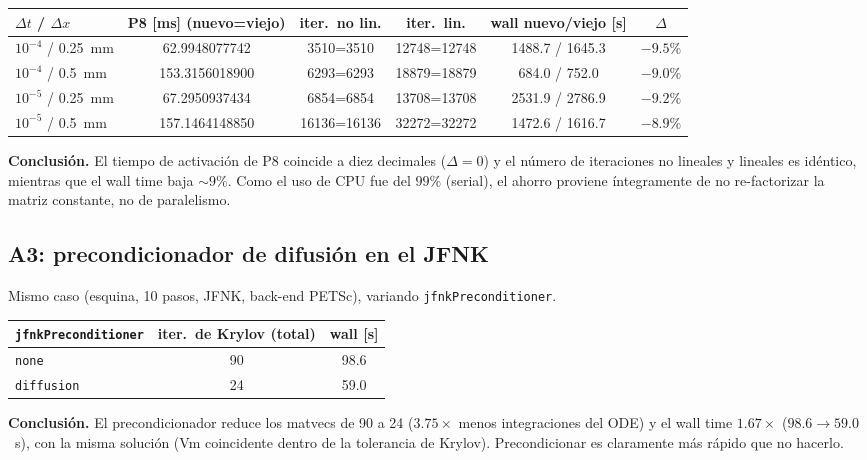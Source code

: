 \documentclass[11pt,a4paper]{article}
\newcommand{\code}[1]{\texttt{\small #1}}
\newcommand{\dictkey}[1]{\textcolor{black!60!green}{\texttt{\footnotesize #1}}}
\begin{document}
\begin{center}
\begin{tabular}{@{}lccccc@{}}
\toprule
$\Delta t$ / $\Delta x$ & P8 [ms] (nuevo=viejo) & iter.\ no lin. & iter.\ lin. &
    wall nuevo/viejo [s] & $\Delta$ \\
\midrule
$10^{-4}$ / \SI{0.25}{mm} & 62.9948077742 & 3510=3510 & 12748=12748 & 1488.7 / 1645.3 & $-9.5\%$ \\
$10^{-4}$ / \SI{0.5}{mm}  & 153.3156018900 & 6293=6293 & 18879=18879 & 684.0 / 752.0 & $-9.0\%$ \\
$10^{-5}$ / \SI{0.25}{mm} & 67.2950937434 & 6854=6854 & 13708=13708 & 2531.9 / 2786.9 & $-9.2\%$ \\
$10^{-5}$ / \SI{0.5}{mm}  & 157.1464148850 & 16136=16136 & 32272=32272 & 1472.6 / 1616.7 & $-8.9\%$ \\
\bottomrule
\end{tabular}
\end{center}

\noindent\textbf{Conclusión.} El tiempo de activación de P8 coincide a diez
decimales ($\Delta=0$) y el número de iteraciones no lineales y lineales es
idéntico, mientras que el wall time baja $\sim 9\%$. Como el uso de CPU fue del
$99\%$ (serial), el ahorro proviene íntegramente de no re-factorizar la matriz
constante, no de paralelismo.

\subsection{A3: precondicionador de difusión en el JFNK}
\label{sec:exp-A3}

Mismo caso (esquina, 10 pasos, JFNK, back-end PETSc), variando
\dictkey{jfnkPreconditioner}.

\begin{center}
\begin{tabular}{@{}lcc@{}}
\toprule
\dictkey{jfnkPreconditioner} & iter.\ de Krylov (total) & wall [s] \\
\midrule
\code{none}      & 90 & 98.6 \\
\code{diffusion} & 24 & 59.0 \\
\bottomrule
\end{tabular}
\end{center}

\noindent\textbf{Conclusión.} El precondicionador reduce los matvecs de 90 a 24
($3.75\times$ menos integraciones del ODE) y el wall time $1.67\times$
($98.6\to59.0$~s), con la misma solución (Vm coincidente dentro de la tolerancia de
Krylov). Precondicionar es claramente más rápido que no hacerlo.
\end{document}
